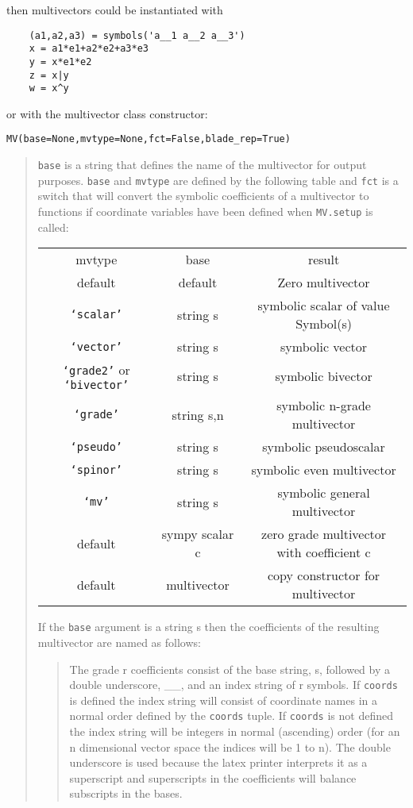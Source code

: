 \documentclass[10pt]{article}
\newcommand{\T}[1]{\texttt{#1}}
\begin{document}
then multivectors could be instantiated with

\begin{lstlisting}
    (a1,a2,a3) = symbols('a__1 a__2 a__3')
    x = a1*e1+a2*e2+a3*e3
    y = x*e1*e2
    z = x|y
    w = x^y
\end{lstlisting}

or with the multivector class constructor:

\T{MV(base=None,mvtype=None,fct=False,blade\_rep=True)}
\begin{quote}
   \T{base} is a string that defines the name of the multivector for output
   purposes. \T{base} and  \T{mvtype} are defined by the following table and \T{fct} is a
   switch that will convert the symbolic coefficients of a multivector to functions
   if coordinate variables have been defined when \T{MV.setup} is called:

\begin{center}
   \begin{tabular}{ccc}
    mvtype &  base  &  result \\
         default &  default &  Zero multivector \\
         \T{`scalar'} &  string s &  symbolic scalar of value Symbol(s) \\
         \T{`vector'}  &  string s &  symbolic vector \\
         \T{`grade2'} or \T{`bivector'} &  string s &  symbolic bivector \\ 
         \T{`grade'} &  string s,n &  symbolic n-grade multivector \\
         \T{`pseudo'} &  string s &  symbolic pseudoscalar \\
         \T{`spinor'} &  string s &  symbolic even multivector \\ 
         \T{`mv'} & string s &  symbolic general multivector \\
         default &  sympy scalar c &  zero grade multivector with coefficient c \\
         default &  multivector &  copy constructor for multivector 
	\end{tabular}
\end{center}

   If the \T{base} argument is a string s then the coefficients of the resulting
   multivector are named as follows:
   	\begin{quote}
     The grade r coefficients consist of the base string, s, followed by a double
     underscore, \_\_, and an index string of r symbols.  If \T{coords} is defined the
     index string will consist of coordinate names in a normal order defined by
     the \T{coords} tuple.  If \T{coords} is not defined the index string will be
     integers in normal (ascending) order (for an n dimensional vector space the
     indices will be 1 to n).  The double underscore is used because the latex printer
     interprets it as a superscript and superscripts in the coefficients will balance
     subscripts in the bases.


\end{quote}
\end{quote}
\end{document}
